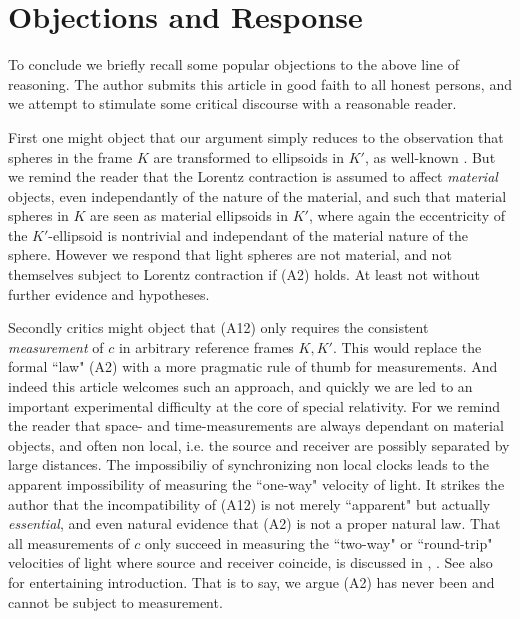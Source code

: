 \documentclass[12pt]{amsart}
\theoremstyle{definition}
\theoremstyle{remark}
\begin{document}







\section{Objections and Response}
To conclude we briefly recall some popular objections to the above line of reasoning. The author submits this article in good faith to all honest persons, and we attempt to stimulate some critical discourse with a reasonable reader.

First one might object that our argument simply reduces to the observation that spheres in the frame $K$ are transformed to ellipsoids in $K'$, as well-known \cite[\S 4]{einstein1905electrodynamics}. But we remind the reader that the Lorentz contraction is assumed to affect \emph{material} objects, even independantly of the nature of the material, and such that material spheres in $K$ are seen as material ellipsoids in $K'$, where again the eccentricity of the $K'$-ellipsoid is nontrivial and independant of the material nature of the sphere. However we respond that light spheres are not material, and not themselves subject to Lorentz contraction if (A2) holds. At least not without further evidence and hypotheses. %

Secondly critics might object that (A12) only requires the consistent \emph{measurement} of $c$ in arbitrary reference frames $K, K'$. This would replace the formal ``law" (A2) with a more pragmatic rule of thumb for measurements. And indeed this article welcomes such an approach, and quickly we are led to an important experimental difficulty at the core of special relativity. For we remind the reader that space- and time-measurements are always dependant on material objects, and often non local, i.e. the source and receiver are possibly separated by large distances. The impossibiliy of synchronizing non local clocks leads to the apparent impossibility of measuring the ``one-way" velocity of light. It strikes the author that the incompatibility of (A12) is not merely ``apparent" but actually \emph{essential}, and even natural evidence that (A2) is not a proper natural law. That all measurements of $c$ only succeed in measuring the ``two-way" or ``round-trip" velocities of light where source and receiver coincide, is discussed in \cite{zhang1997special}, \cite{israel}. See also \cite{vid} for entertaining introduction. That is to say, we argue (A2) has never been and cannot be subject to measurement.
\end{document}

